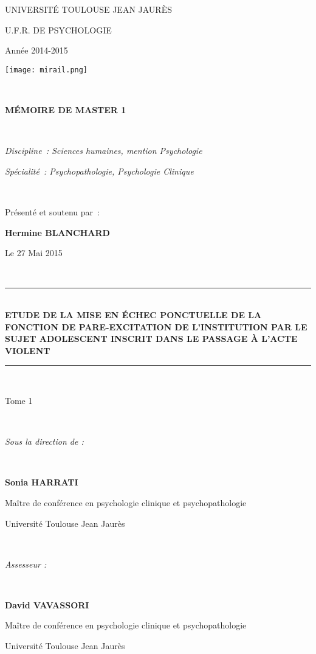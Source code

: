 \documentclass[12pt, openany]{report}
\newcommand{\HRule}{\rule{\linewidth}{0.5mm}}
\begin{document}
\begin{titlepage}
\begin{sffamily}
\begin{center}

\begin{multicols}{2}
\begin{flushleft}
UNIVERSITÉ TOULOUSE JEAN JAURÈS

U.F.R. DE PSYCHOLOGIE

Année 2014-2015
\end{flushleft}
\begin{flushright}
\texttt{[image: mirail.png]}
\end{flushright}
\end{multicols}
\\[3cm]
\centerline{\Large \bfseries MÉMOIRE DE MASTER 1}\\[0.5cm]

\centerline{\textit{Discipline : Sciences humaines, mention Psychologie}}
\centerline{\textit{Spécialité : Psychopathologie, Psychologie Clinique}}\\[1.5cm]

\centerline{\Large Présenté et soutenu par :}
\centerline{\Large \bfseries Hermine BLANCHARD}
\centerline{\Large Le 27 Mai 2015}\\[2cm]

\HRule \\[0.4cm]
{ \Large \bfseries ETUDE DE LA MISE EN ÉCHEC PONCTUELLE DE LA FONCTION DE PARE-EXCITATION DE L’INSTITUTION PAR LE SUJET ADOLESCENT INSCRIT DANS LE PASSAGE À L’ACTE VIOLENT\\[0.4cm] }

\HRule \\[3mm]

\centerline{Tome 1}\\[2.3cm]

\centerline{\Large \textit{Sous la direction de :}}\\[6mm]
\centerline{\Large \bfseries Sonia HARRATI}
\centerline{\Large Maître de conférence en psychologie clinique et psychopathologie}
\centerline{\Large Université Toulouse Jean Jaurès}\\[1cm]
\centerline{\Large \textit{Assesseur :}}\\[6mm]
\centerline{\Large \bfseries David VAVASSORI}
\centerline{\Large Maître de conférence en psychologie clinique et psychopathologie}
\centerline{\Large Université Toulouse Jean Jaurès}\\[1cm]
\end{center}
\end{sffamily}
\end{titlepage}
\end{document}
